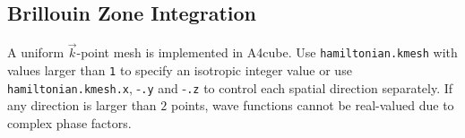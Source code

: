 \documentclass[oribibl]{llncs}
\newcommand{\ttt}[1]{\texttt{#1}}
\newcommand{\codename}{A4cube}
\begin{document}
\subsection{Brillouin Zone Integration} \label{sec:brillouin-zone}
%
A uniform $\vec k$-point mesh is implemented in \codename{}.
Use \ttt{hamiltonian.kmesh} with values larger than \ttt{1} to
specify an isotropic integer value or use
\ttt{hamiltonian.kmesh.x}, -\ttt{.y} and -\ttt{.z} 
to control each spatial direction separately.
If any direction is larger than $2$ points,
wave functions cannot be real-valued due to complex phase factors.
%
%

 

\end{document}
